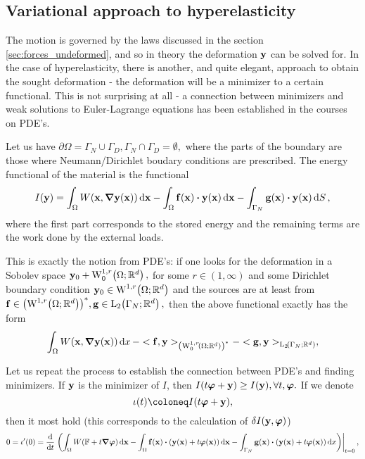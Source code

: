 \documentclass[11pt]{scrartcl} %
\begin{document}
\subsection{Variational approach to hyperelasticity}
\label{sec:variational_hyperel}
The motion is governed by the laws discussed in the section \ref{sec:forces_undeformed}, and so in theory the deformation $\vb{y}$ can be solved for. In the case of hyperelasticity, there is another, and quite elegant, approach to obtain the sought deformation - the deformation will be a minimizer to a certain functional. This is not surprising at all - a connection between minimizers and weak solutions to Euler-Lagrange equations has been established in the courses on PDE's.

\begin{definition}
    Let us have $\partial \Omega = \Gamma_N \cup \Gamma_D, \Gamma_N \cap \Gamma_D = \emptyset,$ where the parts of the boundary are those where Neumann/Dirichlet boudary conditions are prescribed.
The energy functional of the material is the functional
\[
	I\qty(\vb{y}) = \int_{\Omega}W\qty(\vb{x}, \grad \vb{y}\qty(\vb{x}))\dd{\vb{x}} - \int_{\Omega}\vb{f}\qty(\vb{x})\vdot \vb{y}\qty(\vb{x}) \dd{\vb{x}}-\int_{\Gamma_N}\vb{g}\qty(\vb{x}) \vdot \vb{y}\qty(\vb{x})\dd{S},
\]
where the first part corresponds to the stored energy and the remaining terms are the work done by the external loads.
\end{definition}

\begin{remark}
	This is exactly the notion from PDE's: if one looks for the deformation in a Sobolev space $\vb{y}_0 + \WkpzeroSet[1][r]{\Omega;\R^{d}},$ for some $r \in (1, \infty)$ and some Dirichlet boundary condition $\vb{y}_0 \in \WkpSet[1][r]{\Omega;\R^{d}}$ and the sources are at least from $\vb{f} \in \qty(\WkpSet[1][r]{\Omega;\R^{d}})^{*}, \vb{g} \in \LpSet[2]{\Gamma_N; \R^{d}},$ then the above functional exactly has the form
	\[
		\int_{\Omega}W\qty(\vb{x}, \grad \vb{y}\qty(\vb{x}))\dd{x} - <\vb{f},\vb{y}>_{\qty(\WkpzeroSet[1][r]{\Omega;\R^{d}})^{*}} - <\vb{g}, \vb{y}>_{\LpSet[2]{\Gamma_N; \R^{d}}},
	\]
\end{remark}

Let us repeat the process to establish the connection between PDE's and finding minimizers. If $\vb{y}$ is the minimizer of $I$, then $I\qty(t \vb*{\varphi}+\vb{y})\geq I\qty(\vb{y}), \forall t, \vb*{\varphi}.$ If we denote
    \[
	    \iota(t)\coloneq I\qty(t \vb*{\varphi}+\vb{y}),
    \]
    then it most hold (this corresponds to the calculation of $\delta I\qty(\vb{y}, \vb*{\varphi})$)
    \[
	    0 = \iota'(0) = \dv{t} \eval{\qty(\int_{\Omega}W\qty(\fgrad + t \grad \vb*{\varphi})\dd{\vb{x}}- \int_{\Omega}\vb{f}\qty(\vb{x})\vdot \qty(\vb{y}\qty(\vb{x})+t \vb*{\varphi}\qty(\vb{x}))\dd{\vb{x}} - \int_{\Gamma_N}\vb{g}\qty(\vb{x}) \vdot(\vb{y}\qty(\vb{x})+t \vb*{\varphi}\qty(\vb{x}))\dd{x})}_{t=0},
    \]
\end{document}
